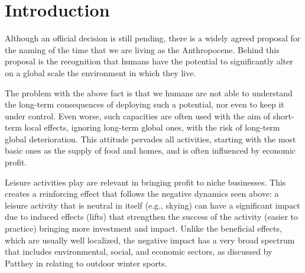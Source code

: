 \documentclass[sustainability,article,submit,pdftex,moreauthors]{Definitions/mdpi}
\begin{document}






\section{Introduction}

Although an official decision is still pending, there is a widely agreed proposal for the naming of the time that we are living as the Anthropocene.  Behind this proposal is the recognition that humans have the potential to significantly alter on a global scale the environment in which they live.

The problem with the above fact is that we humans are not able to understand the long-term consequences of deploying such a potential, nor even to keep it under control. Even worse, such capacities are often used with the aim of short-term local effects, ignoring long-term global ones, with the risk of long-term global deterioration. This attitude pervades all activities, starting with the most basic ones as the supply of food and homes, and is often influenced by economic profit.

Leisure activities play are relevant in bringing profit to niche businesses. This creates a reinforcing effect that follows the negative dynamics seen above: a leisure activity that is neutral in itself (e.g., skying) can have a significant impact due to induced effects (lifts) that strengthen the success of the activity (easier to practice) bringing more investment and impact. Unlike the beneficial effects, which are usually well localized, the negative impact has a very broad spectrum that includes environmental, social, and economic sectors, as discussed by Patthey in \cite{pat08a} relating to outdoor winter sports.
\end{document}
